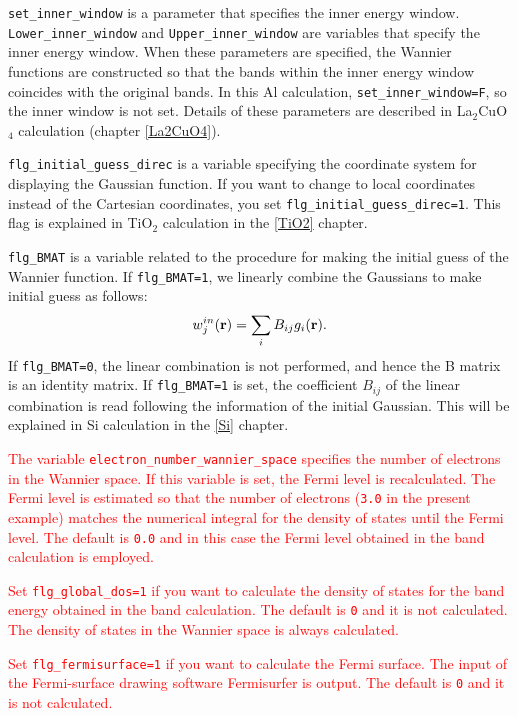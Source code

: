 \documentclass{article}
\newcommand{\tr}[1]{\textcolor{red}{#1}}
\begin{document}
\verb+set_inner_window+ is a parameter that specifies the inner energy window. \verb+Lower_inner_window+ and \verb+Upper_inner_window+ are variables that specify the inner energy window. When these parameters are specified, the Wannier functions are constructed so that the bands within the inner energy window coincides with the original bands. In this Al calculation, \verb+set_inner_window=F+, so the inner window is not set. Details of these parameters are described in La$_2$CuO$_4$ calculation (chapter \ref{La2CuO4}).

\verb+flg_initial_guess_direc+ is a variable specifying the coordinate system for displaying the Gaussian function. If you want to change to local coordinates instead of the Cartesian coordinates, you set \verb+flg_initial_guess_direc=1+. This flag is explained in TiO$_2$ calculation in the \ref{TiO2} chapter.

\verb+flg_BMAT+ is a variable related to the procedure for making the initial guess of the Wannier function. If \verb+flg_BMAT=1+, we linearly combine the Gaussians to make initial guess as follows:
\begin{eqnarray}
w_{j}^{in}({\bf r})=\sum_{i}B_{ij} g_i({\bf r}). \nonumber
\end{eqnarray} 
If \verb+flg_BMAT=0+, the linear combination is not performed, and hence the B matrix is an identity matrix. If \verb+flg_BMAT=1+ is set, the coefficient $B_{ij}$ of the linear combination is read following the information of the initial Gaussian. This will be explained in Si calculation in the \ref{Si} chapter. 

\tr{The variable {\tt electron\_number\_wannier\_space} specifies the number of electrons in the Wannier space. If this variable is set, the Fermi level is recalculated. The Fermi level is estimated so that the number of electrons ({\tt 3.0} in the present example) matches the numerical integral for the density of states until the Fermi level. The default is {\tt 0.0} and in this case the Fermi level obtained in the band calculation is employed.} 

\tr{Set {\tt flg\_global\_dos=1} if you want to calculate the density of states for the band energy obtained in the band calculation. The default is {\tt 0} and it is not calculated. The density of states in the Wannier space is always calculated.}

\tr{Set {\tt flg\_fermisurface=1} if you want to calculate the Fermi surface. The input of the Fermi-surface drawing software {\sc Fermisurfer} is output. The default is {\tt 0} and it is not calculated.} 
\vspace{-3mm}
\end{document}
